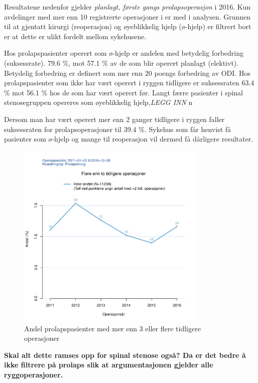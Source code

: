 \documentclass [norsk,a4paper,twoside]{article}\usepackage[]{graphicx}\usepackage[]{color}
\begin{document}
Resultatene nedenfor gjelder  \textit{planlagt, første gangs prolapsoperasjon} i 2016. 
Kun avdelinger med mer enn 10 registrerte operasjoner i er med i
analysen. Grunnen til at gjentatt kirurgi (reoperasjon) og øyeblikkelig hjelp (ø-hjelp)
er filtrert bort er at dette er ulikt fordelt mellom sykehusene.


Hos prolapspasienter operert som ø-hjelp er andelen med betydelig forbedring (suksessrate).  79.6 \%, mot 57.1 \% av de som blir operert planlagt (elektivt). Betydelig forbedring er definert som mer enn 20 poengs forbedring av ODI.
Hos prolapspasienter som ikke har vært operert i ryggen tidligere er suksessraten 63.4 \% mot 56.1 \%
hos de som har vært operert før. 
Langt færre pasienter i spinal stenosegruppen opereres som øyeblikkelig hjelp,\textit{LEGG INN} n%

Dersom man har vært operert mer enn 2 ganger tidligere i
ryggen faller suksessraten for prolapsoperasjoner til 39.4 \%. Sykehus som får henvist få pasienter som ø-hjelp og
mange til reoperasjon vil dermed få dårligere resultater.


\begin{figure}[ht]
\centering \includegraphics[width= 0.8\textwidth]{FigTidlOpAnt3.pdf}
\caption{\label{fig:TidlOpAnt3} Andel prolapspasienter med mer enn 3 eller flere tidligere operasjoner}
\end{figure}

\textbf{Skal alt dette ramses opp for spinal stenose også? Da er det bedre å ikke filtrere på prolaps slik at argumentasjonen gjelder alle ryggoperasjoner.}
\end{document}
